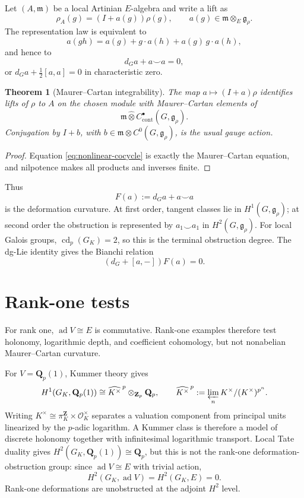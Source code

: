 \documentclass[11pt]{article}
\newtheorem{theorem}{Theorem}[section]
\theoremstyle{definition}
\newcommand{\Qp}{\mathbf Q_p}
\newcommand{\Zp}{\mathbf Z_p}
\newcommand{\OK}{\mathcal O_K}
\newcommand{\GK}{G_K}
\newcommand{\ad}{\operatorname{ad}}
\begin{document}
Let $(A,\mathfrak m)$ be a local Artinian $E$-algebra and write a lift as
\[
\rho_A(g)=(I+a(g))\rho(g),
\qquad a(g)\in\mathfrak m\otimes_E\mathfrak g_\rho.
\]
The representation law is equivalent to
\begin{equation}\label{eq:nonlinear-cocycle}
a(gh)=a(g)+g\cdot a(h)+a(g)\,g\cdot a(h),
\end{equation}
and hence to
\begin{equation}\label{eq:MC}
d_Ga+a\smile a=0,
\end{equation}
or $d_Ga+\frac12[a,a]=0$ in characteristic zero.

\begin{theorem}[Maurer--Cartan integrability]\label{thm:MC}
The map $a\mapsto(I+a)\rho$ identifies lifts of $\rho$ to $A$ on the chosen module with Maurer--Cartan elements of
\[
\mathfrak m\widehat\otimes C^\bullet_{\mathrm{cont}}(G,\mathfrak g_\rho).
\]
Conjugation by $I+b$, with $b\in\mathfrak m\otimes C^0(G,\mathfrak g_\rho)$, is the usual gauge action.
\end{theorem}

\begin{proof}
Equation \eqref{eq:nonlinear-cocycle} is exactly the Maurer--Cartan equation, and nilpotence makes all products and inverses finite.
\end{proof}

Thus
\[
F(a):=d_Ga+a\smile a
\]
is the deformation curvature.  At first order, tangent classes lie in $H^1(G,\mathfrak g_\rho)$; at second order the obstruction is represented by $a_1\smile a_1$ in $H^2(G,\mathfrak g_\rho)$.  For local Galois groups, $\operatorname{cd}_p(G_K)=2$, so this is the terminal obstruction degree.  The dg-Lie identity gives the Bianchi relation
\[
(d_G+[a,-])F(a)=0.
\]

\section{Rank-one tests}

For rank one, $\ad V\cong E$ is commutative.  Rank-one examples therefore test holonomy, logarithmic depth, and coefficient cohomology, but not nonabelian Maurer--Cartan curvature.

For $V=\Qp(1)$, Kummer theory gives
\begin{equation}\label{eq:kummer}
H^1(\GK,\Qp(1))
\cong
\widehat{K^\times}^{\,p}\otimes_{\Zp}\Qp,
\qquad
\widehat{K^\times}^{\,p}:=\varprojlim_n K^\times/(K^\times)^{p^n}.
\end{equation}
Writing $K^\times\cong\pi_K^{\mathbf Z}\times\OK^\times$ separates a valuation component from principal units linearized by the $p$-adic logarithm.  A Kummer class is therefore a model of discrete holonomy together with infinitesimal logarithmic transport.  Local Tate duality gives $H^2(\GK,\Qp(1))\cong\Qp$, but this is not the rank-one deformation-obstruction group: since $\ad V\cong E$ with trivial action,
\[
H^2(\GK,\ad V)=H^2(\GK,E)=0.
\]
Rank-one deformations are unobstructed at the adjoint $H^2$ level.
\end{document}
